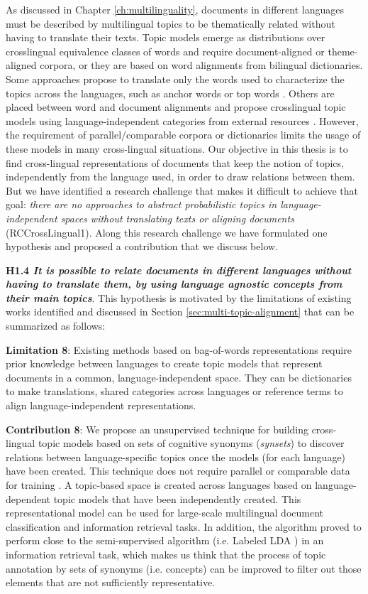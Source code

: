 As discussed in Chapter \ref{ch:multilinguality}, documents in different languages must be described by multilingual topics to be thematically related without having to translate their texts. Topic models emerge as distributions over crosslingual equivalence classes of words and require document-aligned or theme-aligned corpora, or they are based on word alignments from bilingual dictionaries. Some approaches propose to translate only the words used to characterize the topics across the languages, such as anchor words \citep{NEURIPS2018_28b9f8aa} or top words \citep{yang2019multilingual}. Others are placed between word and document alignments and propose crosslingual topic models using language-independent categories from external resources \citep{2020arXiv200911207P}. However, the requirement of parallel/comparable corpora or dictionaries limits the usage of these models in many cross-lingual situations. Our objective in this thesis is to find cross-lingual representations of documents that keep the notion of topics, independently from the language used, in order to draw relations between them. But we have identified a research challenge that makes it difficult to achieve that goal: \textit{there are no approaches to abstract probabilistic topics in language-independent spaces without translating texts or aligning documents} (RCCrossLingual1). Along this research challenge we have formulated one hypothesis and proposed a contribution that we discuss below.

\textbf{H1.4 \textit{It is possible to relate documents in different languages without having to translate them, by using language agnostic concepts from their main topics}}. This hypothesis is motivated by the limitations of existing works identified and discussed in Section \ref{sec:multi-topic-alignment} that can be summarized as follows:

\textbf{Limitation 8}: Existing methods based on bag-of-words representations require prior knowledge between languages to create topic models that represent documents in a common, language-independent space. They can be dictionaries to make translations, shared categories across languages or reference terms to align language-independent representations.

\textbf{Contribution 8}: We propose an unsupervised technique for building cross-lingual topic models based on sets of cognitive synonyms (\textit{synsets}) \citep{Miller1995WordNet:English} to discover relations between language-specific topics once the models (for each language) have been created. This technique does not require parallel or comparable data for training \citep{Badenes-Olmedo2019, Badenes-Olmedo2019b}. A topic-based space is created across languages based on language-dependent topic models that have been independently created. This representational model can be used for large-scale multilingual document classification and information retrieval tasks. In addition, the algorithm proved to perform close to the semi-supervised algorithm (i.e. Labeled LDA \citep{Ramage2009a} )  in an information retrieval task, which makes us think that the process of topic annotation by sets of synonyms (i.e. concepts) can be improved to filter out those elements that are not sufficiently representative.


